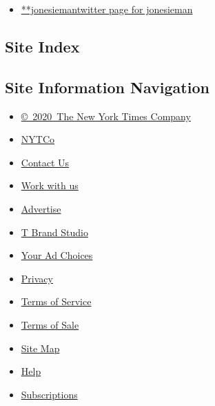 \begin{itemize}
\tightlist
\item
  \href{https://twitter.com/jonesieman}{**jonesiemantwitter page for
  jonesieman}
\end{itemize}

\hypertarget{site-index}{%
\subsection{Site Index}\label{site-index}}

\hypertarget{site-information-navigation}{%
\subsection{Site Information
Navigation}\label{site-information-navigation}}

\begin{itemize}
\tightlist
\item
  \href{https://help.nytimes3xbfgragh.onion/hc/en-us/articles/115014792127-Copyright-notice}{©~2020~The
  New York Times Company}
\end{itemize}

\begin{itemize}
\tightlist
\item
  \href{https://www.nytco.com/}{NYTCo}
\item
  \href{https://help.nytimes3xbfgragh.onion/hc/en-us/articles/115015385887-Contact-Us}{Contact
  Us}
\item
  \href{https://www.nytco.com/careers/}{Work with us}
\item
  \href{https://nytmediakit.com/}{Advertise}
\item
  \href{http://www.tbrandstudio.com/}{T Brand Studio}
\item
  \href{https://www.nytimes3xbfgragh.onion/privacy/cookie-policy\#how-do-i-manage-trackers}{Your
  Ad Choices}
\item
  \href{https://www.nytimes3xbfgragh.onion/privacy}{Privacy}
\item
  \href{https://help.nytimes3xbfgragh.onion/hc/en-us/articles/115014893428-Terms-of-service}{Terms
  of Service}
\item
  \href{https://help.nytimes3xbfgragh.onion/hc/en-us/articles/115014893968-Terms-of-sale}{Terms
  of Sale}
\item
  \href{https://spiderbites.nytimes3xbfgragh.onion}{Site Map}
\item
  \href{https://help.nytimes3xbfgragh.onion/hc/en-us}{Help}
\item
  \href{https://www.nytimes3xbfgragh.onion/subscription?campaignId=37WXW}{Subscriptions}
\end{itemize}
